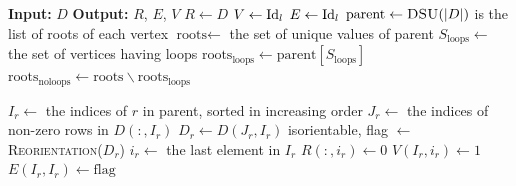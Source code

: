 \begin{algorithm}[H]
\caption{\textsc{WeakColumnReduction}}
\label{alg:weak_red}
\begin{algorithmic}[1]
\State \textbf{Input:} $D$
\State \textbf{Output:} $R$, $E$, $V$
\State $R\gets D$
\State $V\gets\mathrm{Id}_l$
\State $E\gets \mathrm{Id}_l$
\State $\text{parent}\gets \textsc{DSU}(|D|)$
 is the list of roots of each vertex
\State $\text{roots}\gets$ the set of unique values of parent
\State $S_{\text{loops}}\gets$ the set of vertices having loops
\State $\text{roots}_{\text{loops}}\gets \text{parent}[S_\text{loops}]$
\State $\text{roots}_{\text{noloops}}\gets \text{roots}\backslash \text{roots}_{\text{loops}}$

\State $I_r\gets$ the indices of $r$ in parent, sorted in increasing order
\State $J_r\gets$ the indices of non-zero rows in $D(:, I_r)$ 
\State $D_r\gets D(J_r, I_{r})$
\State isorientable, flag $\gets$ \textsc{Reorientation}($D_r$)
\State $i_r\gets$ the last element in $I_r$
\State $R(:, i_r)\gets 0$
\State $V(I_r, i_r)\gets 1$
\State $E(I_r, I_r)\gets \text{flag}$
\EndIf
\EndFor


\Statex







\end{algorithmic}
\end{algorithm}